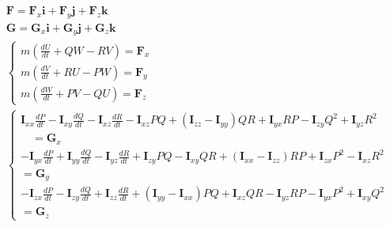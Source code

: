 \documentclass[11pt,a4paper]{article}
\begin{document}
\begin{equation*}
\begin{aligned}
& \boldsymbol{F}=\boldsymbol{F}_x \boldsymbol{i}+\boldsymbol{F}_y \boldsymbol{j}+\boldsymbol{F}_z \boldsymbol{k} \\
& \boldsymbol{G}=\boldsymbol{G}_x \boldsymbol{i}+\boldsymbol{G}_y \boldsymbol{j}+\boldsymbol{G}_z \boldsymbol{k} \\
& \left\{\begin{array}{l}
m\left(\frac{d U}{d t}+Q W-R V\right)=\boldsymbol{F}_x \\
m\left(\frac{d V}{d t}+R U-P W\right)=\boldsymbol{F}_y \\
m\left(\frac{d W}{d t}+P V-Q U\right)=\boldsymbol{F}_z
\end{array}\right. \\
& \left\{\begin{array}{l}
\boldsymbol{I}_{x x} \frac{d P}{d t}-\boldsymbol{I}_{x y} \frac{d Q}{d t}-\boldsymbol{I}_{x z} \frac{d R}{d t}-\boldsymbol{I}_{x z} P Q+\left(\boldsymbol{I}_{z z}-\boldsymbol{I}_{y y}\right) Q R+\boldsymbol{I}_{y x} R P-\boldsymbol{I}_{z y} Q^2+\boldsymbol{I}_{y z} R^2 \\
\quad=\boldsymbol{G}_x \\
-\boldsymbol{I}_{y x} \frac{d P}{d t}+\boldsymbol{I}_{y y} \frac{d Q}{d t}-\boldsymbol{I}_{y z} \frac{d R}{d t}+\boldsymbol{I}_{z y} P Q-\boldsymbol{I}_{x y} Q R+\left(\boldsymbol{I}_{x x}-\boldsymbol{I}_{z z}\right) R P+\boldsymbol{I}_{z x} P^2-\boldsymbol{I}_{x z} R^2 \\
=\boldsymbol{G}_y \\
-\boldsymbol{I}_{z x} \frac{d P}{d t}-\boldsymbol{I}_{z y} \frac{d Q}{d t}+\boldsymbol{I}_{z z} \frac{d R}{d t}+\left(\boldsymbol{I}_{y y}-\boldsymbol{I}_{x x}\right) P Q+\boldsymbol{I}_{x z} Q R-\boldsymbol{I}_{y z} R P-\boldsymbol{I}_{y x} P^2+\boldsymbol{I}_{x y} Q^2 \\
=\boldsymbol{G}_z
\end{array}\right.
\end{aligned}
\end{equation*}
\end{document}

